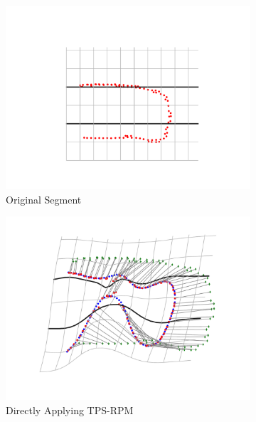 \begin{figure}
  \begin{subfigure}[b]{.48\linewidth}
    \includegraphics[width=\textwidth]{figs/orig.pdf}
    \caption{Original Segment}
    \label{fig:no_warp}
  \end{subfigure}
  \begin{subfigure}[b]{.48\linewidth}
    \includegraphics[width=\textwidth]{figs/warp_root.pdf}
    \caption{Directly Applying TPS-RPM}
    \label{fig:warp_root}
  \end{subfigure}
  \begin{subfigure}[b]{.48\linewidth}

\end{subfigure}
\end{figure}
